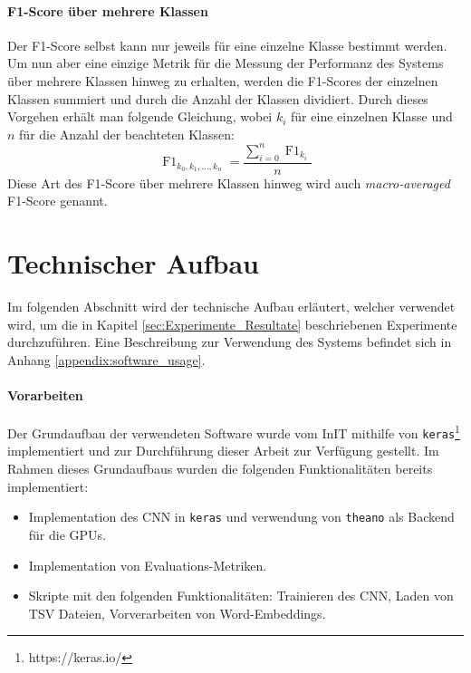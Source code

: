 \paragraph{F1-Score über mehrere Klassen} Der F1-Score selbst kann nur jeweils für eine einzelne Klasse bestimmt werden. Um nun aber eine einzige Metrik für die Messung der Performanz des Systems über mehrere Klassen hinweg zu erhalten, werden die F1-Scores der einzelnen Klassen summiert und durch die Anzahl der Klassen dividiert. Durch dieses Vorgehen erhält man folgende Gleichung, wobei $k_i$ für eine einzelnen Klasse und $n$ für die Anzahl der beachteten Klassen:
\begin{equation}
\operatorname{F1}_{k_0, k_1, \dots, k_n} = \frac{\sum_{i=0}^{n} \operatorname{F1}_{k_i}}{n}
\end{equation}
Diese Art des F1-Score über mehrere Klassen hinweg wird auch \emph{macro-averaged} F1-Score genannt.

\section{Technischer Aufbau}
\label{technical_setup}
Im folgenden Abschnitt wird der technische Aufbau erläutert, welcher verwendet wird, um die in Kapitel \ref{sec:Experimente_Resultate} beschriebenen Experimente durchzuführen. Eine Beschreibung zur Verwendung des Systems befindet sich in Anhang \ref{appendix:software_usage}.

\paragraph{Vorarbeiten}
\label{technichal_setup:prework}
Der Grundaufbau der verwendeten Software wurde vom InIT mithilfe von \texttt{keras}\footnote{https://keras.io/} implementiert und zur Durchführung dieser Arbeit zur Verfügung gestellt. Im Rahmen dieses Grundaufbaus wurden die folgenden Funktionalitäten bereits implementiert:

\begin{itemize}[noitemsep]
	\item Implementation des CNN in \texttt{keras} und verwendung von \texttt{theano} \cite{theanoCitShort} als Backend für die \gls{GPU}s.
	\item Implementation von Evaluations-Metriken.
	\item Skripte mit den folgenden Funktionalitäten: Trainieren des CNN, Laden von TSV Dateien, Vorverarbeiten von Word-Embeddings.
\end{itemize}

